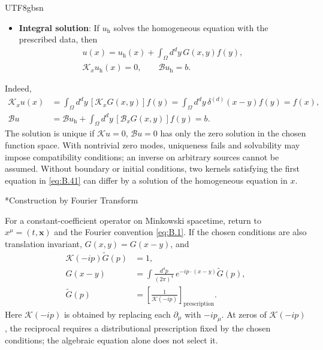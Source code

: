 \documentclass[11pt,a4paper,oneside]{report}
\makeatletter
\newcommand\topic{\@startsection{paragraph}{4}{\z@}{-1.7ex plus -.3ex}{.5ex}{\normalfont\normalsize\bfseries\itshape\boldmath}*}
\makeatother
\begin{document}
\begin{CJK*}{UTF8}{gbsn}
\begin{itemize}
\item \textbf{\boldmath Integral solution}: If $u_{\mathrm h}$ solves the homogeneous equation with the prescribed data, then
\begin{equation*}
\begin{aligned}
{\displaystyle u(x)=u_{\mathrm h}(x)+\int_\Omega d^dy\,G(x,y)f(y),}\\
\mathcal K_xu_{\mathrm h}(x)=0,\qquad \mathcal Bu_{\mathrm h}=b.
\end{aligned}
\tag{B.42}\label{eq:B.42}
\end{equation*}
\end{itemize}

Indeed,
\begin{equation*}
\begin{aligned}
\mathcal K_xu(x)
&=\int_\Omega d^dy\,[\mathcal K_xG(x,y)]f(y)
=\int_\Omega d^dy\,\delta^{(d)}(x-y)f(y)=f(x),\\
\mathcal Bu&=\mathcal Bu_{\mathrm h}
+\int_\Omega d^dy\,[\mathcal B_xG(x,y)]f(y)=b.
\end{aligned}
\tag{B.43}\label{eq:B.43}
\end{equation*}
The solution is unique if $\mathcal Ku=0$, $\mathcal Bu=0$ has only the zero solution in the chosen function space. With nontrivial zero modes, uniqueness fails and solvability may impose compatibility conditions; an inverse on arbitrary sources cannot be assumed. Without boundary or initial conditions, two kernels satisfying the first equation in \eqref{eq:B.41} can differ by a solution of the homogeneous equation in $x$.

\topic{Construction by Fourier Transform}

For a constant-coefficient operator on Minkowski spacetime, return to $x^\mu=(t,\mathbf x)$ and the Fourier convention \eqref{eq:B.1}. If the chosen conditions are also translation invariant, $G(x,y)=G(x-y)$, and
\begin{equation*}
\begin{aligned}
\mathcal K(-ip)\widetilde G(p)&=1,\\
G(x-y)&=\int\frac{d^4p}{(2\pi)^4}\,
e^{-ip\cdot(x-y)}\widetilde G(p),\\
\widetilde G(p)&=\left[\frac{1}{\mathcal K(-ip)}\right]_{\mathrm{prescription}}.
\end{aligned}
\tag{B.44}\label{eq:B.44}
\end{equation*}
Here $\mathcal K(-ip)$ is obtained by replacing each $\partial_\mu$ with $-ip_\mu$. At zeros of $\mathcal K(-ip)$, the reciprocal requires a distributional prescription fixed by the chosen conditions; the algebraic equation alone does not select it.


\end{CJK*}
\end{document}
